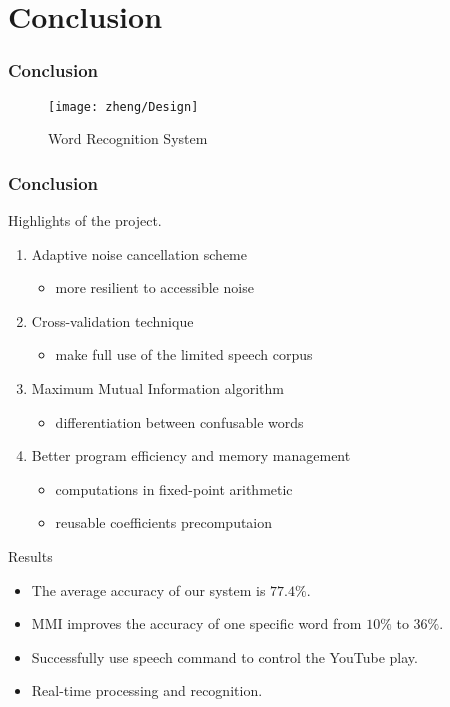 \section{Conclusion}

\begin{frame}
\frametitle{Conclusion}
\begin{figure}[H]
\begin{center}
\texttt{[image: zheng/Design]} 
\vspace{-20pt}
\caption{Word Recognition System}
\label{fig 20}
\end{center}
\end{figure}
\end{frame}

\begin{frame}
\frametitle{Conclusion}
Highlights of the project.
\begin{enumerate}
	\item Adaptive noise cancellation scheme
	\begin{itemize}
		\item more resilient to accessible noise
	\end{itemize}
	\item Cross-validation technique
	\begin{itemize}
		\item make full use of the limited speech corpus
	\end{itemize}
	\item Maximum Mutual Information algorithm
	\begin{itemize}
		\item differentiation between confusable words
	\end{itemize}
	\item Better program efficiency and memory management
	\begin{itemize}
		\item computations in fixed-point arithmetic
		\item reusable coefficients precomputaion
	\end{itemize}
\end{enumerate}
\end{frame}

\begin{frame}
\begin{block}{Results}
\begin{itemize}
	\item The average accuracy of our system is $77.4\%$.
	\item MMI improves the accuracy of one specific word from $10\%$ to $36\%$.
	\item Successfully use speech command to control the YouTube play.
	\item Real-time processing and recognition.
\end{itemize}
\end{block}
\end{frame}

